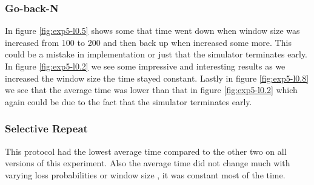 \documentclass[10pt, a4paper]{article}
\begin{document}
    \subsubsection{Go-back-N}
        
        In figure \ref{fig:exp5-l0.5} shows some that time went down when window size was increased from 100 to 200 and then back up when increased some more. This could be a mistake in implementation or just that the simulator terminates early. In figure \ref{fig:exp5-l0.2} we see some impressive and interesting results as we increased the window size the time stayed constant. Lastly in figure \ref{fig:exp5-l0.8} we see that the average time was lower than that in figure \ref{fig:exp5-l0.2} which again could be due to the fact that the simulator terminates early.
    
    \subsubsection{Selective Repeat}
        
        This protocol had the lowest average time compared to the other two on all versions of this experiment. Also the average time did not change much with varying loss probabilities or window size , it was constant most of the time.
\end{document}
